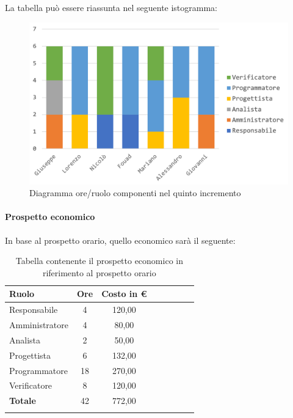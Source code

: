 			La tabella può essere riassunta nel seguente istogramma:
			\begin{figure}[H]
				\centering
				\includegraphics[width=0.8\linewidth]{./images/preventivo/incremento5-1.png}
				\caption{Diagramma ore/ruolo componenti nel quinto incremento}
				\label{fig:diagramma suddivione ruoli incremento V}
			\end{figure}
			\pagebreak
			
			\paragraph{Prospetto economico}
			In base al prospetto orario, quello economico sarà il seguente: 
			
			\begin{longtable}{|l|c|c|c|c|c|c|c|}
				\hline
				\rowcolor{lighter-grayer}
				\textbf{Ruolo} & \textbf{Ore} & \textbf{Costo in € } \\
				\hline
				\endfirsthead
				
				\hline
				Responsabile 	    & 4 & 120,00\\
				\hline 
				\hline
				Amministratore	   & 4 & 80,00\\
				\hline
				\hline
				Analista 				& 2 & 50,00\\
				\hline
				\hline
				Progettista 		   & 6 & 132,00\\
				\hline
				\hline
				Programmatore 	  & 18 & 270,00\\
				\hline
				\hline
				Verificatore 		   & 8 & 120,00\\
				\hline
				\textbf{Totale} 	 & 42 & 772,00\\
				\hline
				\caption{Tabella contenente il prospetto economico in riferimento al prospetto orario}
			\end{longtable}
			
